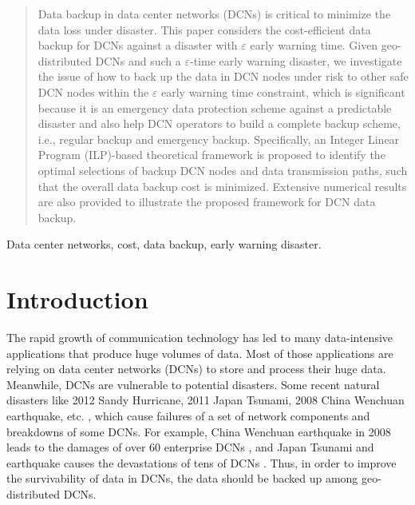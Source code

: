 \documentclass[conference]{IEEEtran}\IEEEoverridecommandlockouts
\begin{document}
\maketitle
\begin{abstract}
Data backup in data center networks (DCNs) is critical to minimize the data loss under disaster. This paper considers the cost-efficient data backup for DCNs against a disaster with $\varepsilon$ early warning time. Given  geo-distributed DCNs and such a $\varepsilon$-time early warning disaster, we investigate the issue of how to back up the data in DCN nodes under risk to other safe DCN nodes within the $\varepsilon$ early warning time constraint, which is significant because it is an emergency data protection scheme against a predictable disaster and also help DCN operators to build a complete backup scheme, i.e., regular backup and emergency backup.
Specifically, an Integer Linear Program (ILP)-based theoretical framework is proposed to identify the optimal selections of backup DCN nodes and data transmission paths, such that the overall data backup cost is minimized. Extensive numerical results are also provided to illustrate the proposed framework for DCN data backup.



\end{abstract}


\begin{IEEEkeywords}
 Data center networks, cost, data backup,  early warning disaster.
\end{IEEEkeywords}

\IEEEpeerreviewmaketitle

\section{Introduction}\label{Introduction}
The rapid growth of communication technology has led to many data-intensive applications that produce huge volumes of data.  Most of those applications  are relying on data center networks (DCNs) to store and process their huge data. Meanwhile, DCNs are vulnerable to potential disasters. Some recent natural disasters like  2012 Sandy Hurricane, 2011 Japan Tsunami, 2008 China Wenchuan earthquake, etc. \cite{ K.Tanaka2008, 2008Sichuan,A.Kwasinski2009, Ran2011, K.Morrison2011, 2011Tohoku,T.Adachi2011, Sandy, A.Kwasinski2013}, which cause failures of a set of network components and  breakdowns of some DCNs. For example, China Wenchuan earthquake in 2008 leads to the damages of over 60 enterprise DCNs \cite{2008Sichuan, Ran2011}, and Japan Tsunami and earthquake causes the devastations of tens of DCNs    \cite{2011Tohoku, T.Adachi2011}. Thus, in order to improve the survivability of data in DCNs,  the data should be backed up among geo-distributed DCNs.
\end{document}
